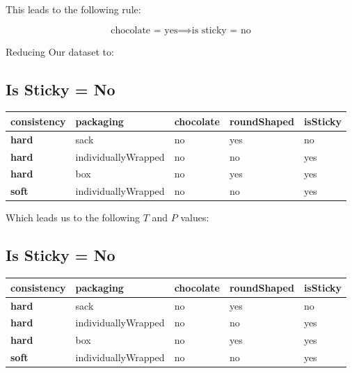 \documentclass[12pt]{scrartcl}
\begin{document}
This leads to the following rule:

\begin{equation*}
    \text{chocolate = yes} \implies \text{is sticky = no}
\end{equation*}

Reducing Our dataset to:

\subsection{Is Sticky = No}
\begin{table}[H]
    \centering
    \begin{tabular}{|l|l|l|l|l|}
        \hline
        \textbf{consistency} & \textbf{packaging}  & \textbf{chocolate} & \textbf{roundShaped} & \textbf{isSticky} \\\hline
        \textbf{hard}        & sack                & no                 & yes                  & no \\
        \textbf{hard}        & individuallyWrapped & no                 & no                   & yes \\
        \textbf{hard}        & box                 & no                 & yes                  & yes \\
        \textbf{soft}        & individuallyWrapped & no                 & no                   & yes \\\hline
    \end{tabular}
\end{table}

Which leads us to the following $T$ and $P$ values:

\subsection{Is Sticky = No}
\begin{table}[H]
    \centering
    \begin{tabular}{|l|l|l|l|l|}
        \hline
        \textbf{consistency} & \textbf{packaging}  & \textbf{chocolate} & \textbf{roundShaped} & \textbf{isSticky} \\\hline
        \textbf{hard}        & sack                & no                 & yes                  & no \\
        \textbf{hard}        & individuallyWrapped & no                 & no                   & yes \\
        \textbf{hard}        & box                 & no                 & yes                  & yes \\
        \textbf{soft}        & individuallyWrapped & no                 & no                   & yes \\\hline
    \end{tabular}
\end{table}
\end{document}
